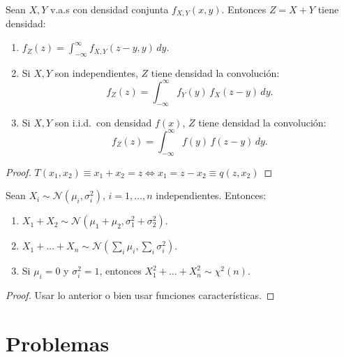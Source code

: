 \textcolor{azulresalt}{
\begin{proposicion}
Sean $X, Y$ v.a.s con densidad conjunta $f_{X,Y}(x,y)$. Entonces $Z = X + Y$ tiene densidad:
\begin{enumerate}
  \item $f_Z(z) = \displaystyle\int_{-\infty}^\infty f_{X,Y}(z - y, y)\,dy$.
  \item Si $X, Y$ son independientes, $Z$ tiene densidad la convolución:
        \[
          f_Z(z) = \int_{-\infty}^\infty f_Y(y)\,f_X(z - y)\,dy.
        \]
  \item Si $X, Y$ son i.i.d.\ con densidad $f(x)$, $Z$ tiene densidad la convolución:
        \[
          f_Z(z) = \int_{-\infty}^\infty f(y)\,f(z - y)\,dy.
        \]
\end{enumerate}
\end{proposicion}
\begin{proof} $T(x_1, x_2) \equiv x_1 + x_2 = z \iff x_1 = z - x_2 \equiv q(z, x_2)$
\end{proof}
\begin{proposicion}
Sean $X_i \sim \mathcal{N}(\mu_i, \sigma_i^2)$, $i=1,\dots,n$ independientes. Entonces:
\begin{enumerate}
  \item $X_1 + X_2 \sim \mathcal{N}(\mu_1 + \mu_2, \sigma_1^2 + \sigma_2^2)$.
  \item $X_1 + \dots + X_n \sim \mathcal{N}\!\left(\sum_i \mu_i, \sum_i \sigma_i^2\right)$.
  \item Si $\mu_i = 0$ y $\sigma_i^2 = 1$, entonces $X_1^2 + \dots + X_n^2 \sim \chi^2(n)$.
\end{enumerate}
\end{proposicion}
\begin{proof}
Usar lo anterior o bien usar funciones características.
\end{proof}}

\section{Problemas}

